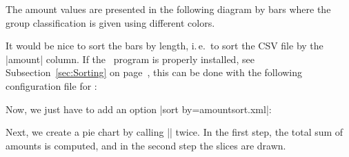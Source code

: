\documentclass[a4paper,11pt]{ltxdoc}
\begin{document}
The amount values are presented in the following diagram by bars where
the group classification is given using different colors.

\begin{dispExample}
\end{dispExample}


\clearpage
It would be nice to sort the bars by length, i.\,e.\ to sort the CSV file
by the |amount| column. If the \csvsorter\ program is properly installed,
see Subsection~\ref{sec:Sorting} on page~\pageref{sec:Sorting},
this can be done with the following configuration file for \csvsorter:


Now, we just have to add an option |sort by=amountsort.xml|:
\begin{dispExample}
\end{dispExample}




\clearpage
Next, we create a pie chart by calling |\csvreader| twice.
In the first step, the total sum of amounts is computed, and in the second
step the slices are drawn.
\end{document}
